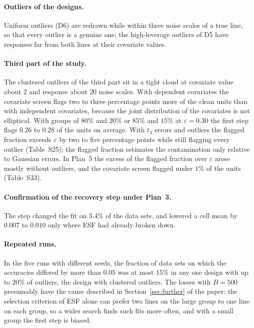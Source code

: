 \paragraph{Outliers of the designs.} Uniform outliers (D6) are redrawn while within three noise
scales of a true line, so that every outlier is a genuine one; the high-leverage outliers of D5
have responses far from both lines at their covariate values.

\paragraph{Third part of the study.} The clustered outliers of the third part sit in a tight
cloud at covariate value about $2$ and response about $20$ noise scales. With dependent
covariates the covariate screen flags two to three percentage points more of the clean units
than with independent covariates, because the joint distribution of the covariates is not
elliptical. With groups of $80\%$ and $20\%$ or $85\%$ and $15\%$ at $\varepsilon=0.30$ the first
step flags $0.26$ to $0.28$ of the units on average. With $t_3$ errors and outliers the flagged
fraction exceeds $\varepsilon$ by two to five percentage points while still flagging every
outlier (Table~S25); the flagged fraction estimates the contamination only relative to Gaussian
errors. In Plan~5 the excess of the flagged fraction over $\varepsilon$ arose mostly without
outliers, and the covariate screen flagged under $1\%$ of the units (Table~S33).

\paragraph{Confirmation of the recovery step under Plan~3.} The step changed the fit on $3.4\%$ of
the data sets, and lowered a cell mean by $0.007$ to $0.010$ only where ESF had already
broken down.

\paragraph{Repeated runs.} In the five runs with different seeds, the fraction of data sets on
which the accuracies differed by more than $0.05$ was at most $15\%$ in any one design with up to
$20\%$ of outliers, the design with clustered outliers. The losses with $B=500$ presumably have
the cause described in Section~\ref{sec:further} of the paper: the selection criterion of ESF alone can
prefer two lines on the large group to one line on each group, so a wider search finds such fits
more often, and with a small group the first step is biased.

